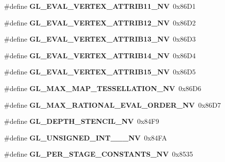 \begin{DoxyCompactItemize}
\item 
\#define {\bfseries G\+L\+\_\+\+E\+V\+A\+L\+\_\+\+V\+E\+R\+T\+E\+X\+\_\+\+A\+T\+T\+R\+I\+B11\+\_\+\+N\+V}~0x86\+D1\label{_s_d_l__opengl_8h_aae88b48e60fffd44eceb95b8fec64456}

\item 
\#define {\bfseries G\+L\+\_\+\+E\+V\+A\+L\+\_\+\+V\+E\+R\+T\+E\+X\+\_\+\+A\+T\+T\+R\+I\+B12\+\_\+\+N\+V}~0x86\+D2\label{_s_d_l__opengl_8h_aafdd41661a0e66603bb9b5187fb22d39}

\item 
\#define {\bfseries G\+L\+\_\+\+E\+V\+A\+L\+\_\+\+V\+E\+R\+T\+E\+X\+\_\+\+A\+T\+T\+R\+I\+B13\+\_\+\+N\+V}~0x86\+D3\label{_s_d_l__opengl_8h_ab626658e0524d4cb1fc21b2ef75eb077}

\item 
\#define {\bfseries G\+L\+\_\+\+E\+V\+A\+L\+\_\+\+V\+E\+R\+T\+E\+X\+\_\+\+A\+T\+T\+R\+I\+B14\+\_\+\+N\+V}~0x86\+D4\label{_s_d_l__opengl_8h_a096a4856e83659669617d2ff50a86481}

\item 
\#define {\bfseries G\+L\+\_\+\+E\+V\+A\+L\+\_\+\+V\+E\+R\+T\+E\+X\+\_\+\+A\+T\+T\+R\+I\+B15\+\_\+\+N\+V}~0x86\+D5\label{_s_d_l__opengl_8h_ac2d950abf392e84ab43057381b285e79}

\item 
\#define {\bfseries G\+L\+\_\+\+M\+A\+X\+\_\+\+M\+A\+P\+\_\+\+T\+E\+S\+S\+E\+L\+L\+A\+T\+I\+O\+N\+\_\+\+N\+V}~0x86\+D6\label{_s_d_l__opengl_8h_aa7e75cddcd1f8297784205c568570210}

\item 
\#define {\bfseries G\+L\+\_\+\+M\+A\+X\+\_\+\+R\+A\+T\+I\+O\+N\+A\+L\+\_\+\+E\+V\+A\+L\+\_\+\+O\+R\+D\+E\+R\+\_\+\+N\+V}~0x86\+D7\label{_s_d_l__opengl_8h_a3a970e07aeee1e9d1a56b095bab846a3}

\item 
\#define {\bfseries G\+L\+\_\+\+D\+E\+P\+T\+H\+\_\+\+S\+T\+E\+N\+C\+I\+L\+\_\+\+N\+V}~0x84\+F9\label{_s_d_l__opengl_8h_a912fde950690b8b00a08200da4bf59af}

\item 
\#define {\bfseries G\+L\+\_\+\+U\+N\+S\+I\+G\+N\+E\+D\+\_\+\+I\+N\+T\+\_\+\_\+\_\+\+N\+V}~0x84\+F\+A\label{_s_d_l__opengl_8h_aa242ed308ce41965314124f219df24b2}

\item 
\#define {\bfseries G\+L\+\_\+\+P\+E\+R\+\_\+\+S\+T\+A\+G\+E\+\_\+\+C\+O\+N\+S\+T\+A\+N\+T\+S\+\_\+\+N\+V}~0x8535\label{_s_d_l__opengl_8h_ae684ba3b435939f9a3ff0ebc565ed183}


\end{DoxyCompactItemize}
